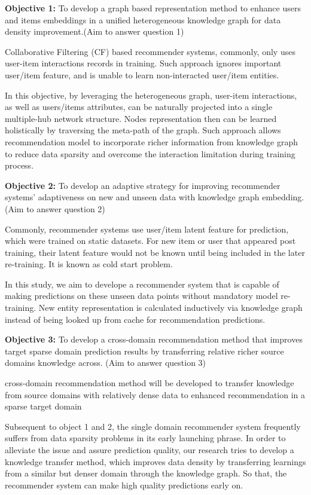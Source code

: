 \bigskip
\textbf{Objective 1:} To develop a graph based representation method to enhance users and items embeddings in a unified heterogeneous knowledge graph for data density improvement.(Aim to answer question 1)

Collaborative Filtering (CF) based recommender systems, commonly, only uses user-item interactions records in training. Such approach ignores important user/item feature, and is unable to learn non-interacted user/item entities. 

In this objective, by leveraging the heterogeneous graph, user-item interactions, as well as users/items attributes, can be naturally projected into a single multiple-hub network \citep{Shi2017} structure. Nodes representation then can be learned holistically by traversing the meta-path of the graph. Such approach allows recommendation model to incorporate richer information from knowledge graph to reduce data sparsity and overcome the interaction limitation during training process.


\bigskip
\textbf{Objective 2:} To develop an adaptive strategy for improving recommender systems’ adaptiveness on new and unseen data with knowledge graph embedding. (Aim to answer question 2)

Commonly, recommender systems use user/item latent feature for prediction, which were trained on static datasets. For new item or user that appeared post training, their latent feature would not be known until being included in the later re-training. It is known as cold start problem.

In this study, we aim to develope a recommender system that is capable of making predictions on these unseen data points without mandatory model re-training. New entity representation is calculated inductively via knowledge graph instead of being looked up from cache for recommendation predictions.


\bigskip
\textbf{Objective 3:} To develop a cross-domain recommendation method that improves target sparse domain prediction results by transferring relative richer source domains knowledge across. (Aim to answer question 3)

cross-domain recommendation method will be developed to transfer knowledge from source domains with relatively dense data to  enhanced recommendation in a sparse target domain

Subsequent to object 1 and 2, the single domain recommender system frequently suffers from data sparsity problems in its early launching phrase. In order to alleviate the issue and assure prediction quality, our research tries to develop a knowledge transfer method, which improves data density by transferring learnings from a similar but denser domain through the knowledge graph. So that, the recommender system can make high quality predictions early on.

